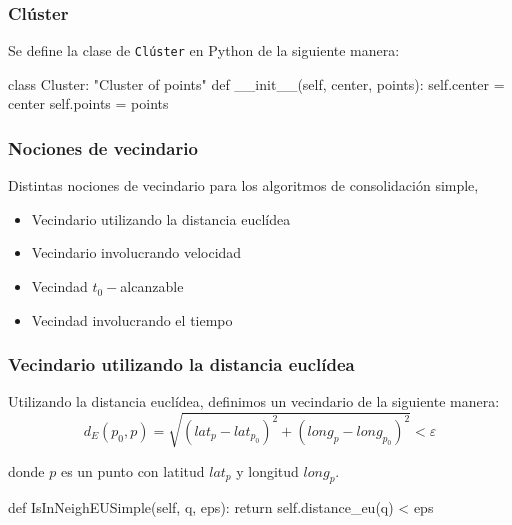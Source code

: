 \documentclass[10pt, spanish]{beamer}
\begin{document}
\begin{frame}[fragile]
\frametitle{Cl\'uster}
Se define la clase de \texttt{Cl\'uster} en Python de la siguiente manera:\\
\bigskip
\begin{python}
class Cluster:
"Cluster of points"
    def __init__(self, center, points):
	self.center = center
	self.points = points
\end{python}

\end{frame}



\begin{frame}[fragile]
\frametitle{Nociones de vecindario}

Distintas nociones de vecindario para los algoritmos de consolidaci\'on simple,
\begin{itemize}
	\item Vecindario utilizando la distancia eucl\'idea
	\item Vecindario involucrando velocidad
	\item Vecindad $t_0-$alcanzable
	\item Vecindad involucrando el tiempo
\end{itemize}
\end{frame}

\begin{frame}[fragile]
\frametitle{Vecindario utilizando la distancia eucl\'idea}

Utilizando la distancia eucl\'idea, definimos un vecindario de la siguiente manera:\\

$$ d_E(p_0, p) = \sqrt{(lat_{p} - lat_{p_0})^2 + (long_{p} - long_{p_0})^2 } < \varepsilon $$

donde $p$ es un punto con latitud $lat_{p}$ y longitud $long_{p}$.\\

\bigskip
\begin{python}
    def IsInNeighEUSimple(self, q, eps):
	return self.distance_eu(q) < eps
\end{python}

\end{frame}

\end{document}

